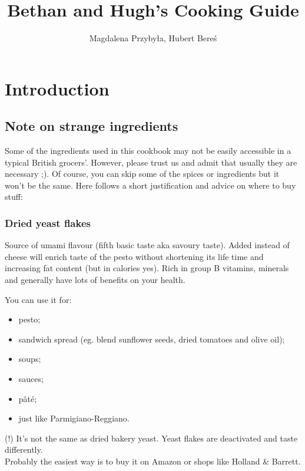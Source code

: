 \documentclass[%
titlepage,
b5paper,
twoside,
11pt
]{book}
\begin{document}
\frontmatter
\title{Bethan and Hugh's Cooking Guide}
\author{Magdalena Przybyła, Hubert Bereś}

\maketitle
\thispagestyle{empty}
\newpage

\tableofcontents

\mainmatter
\chapter{Introduction}

\section*{Note on strange ingredients}

Some of the ingredients used in this cookbook may not be easily accessible in a typical British grocers'. However, please trust us and admit that usually they are necessary ;). Of course, you can skip some of the spices or ingredients but it won't be the same. Here follows a short justification and advice on where to buy stuff: 

\subsection*{Dried yeast flakes}

Source of umami flavour (fifth basic taste aka savoury taste). Added instead of cheese will enrich taste of the pesto without shortening its life time and increasing fat content (but in calories yes). Rich in group B vitamins, minerals and generally have lots of benefits on your health. 

You can use it for:

\begin{itemize}
    \setlength\itemsep{0.1mm}
    \item pesto;
    \item sandwich spread (eg. blend sunflower seeds, dried tomatoes and olive oil);
    \item soups;
    \item sauces; 
    \item pâté;
    \item just like Parmigiano-Reggiano.
\end{itemize}

(!) It's not the same as dried bakery yeast.
Yeast flakes are deactivated and taste differently.
\\
Probably the easiest way is to buy it on Amazon or shops like Holland \& Barrett.
\end{document}
